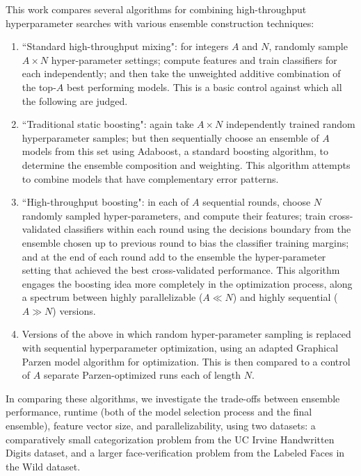 \documentclass[11pt,twocolumn]{article}
\begin{document}
This work compares several algorithms for combining high-throughput hyperparameter searches with various ensemble construction techniques: 
\begin{enumerate}
\item ``Standard high-throughput mixing":  for integers $A$ and $N$, randomly sample $A \times N$ hyper-parameter settings; compute features and train classifiers for each independently; and then take the unweighted additive combination of the top-$A$ best performing models.  This is a basic control against which all the following are judged. 
\item ``Traditional static boosting":  again take $A \times N$ independently trained random hyperparameter samples; but then sequentially choose an ensemble of $A$ models from this set using Adaboost, a standard boosting algorithm, to determine the ensemble composition and weighting.   This algorithm attempts to combine models that have complementary error patterns.  
\item ``High-throughput boosting":  in each of $A$ sequential rounds, choose $N$ randomly sampled hyper-parameters, and compute their features; train cross-validated classifiers within each round using the decisions boundary from the ensemble chosen up to previous round to bias the classifier training margins; and at the end of each round add to the ensemble the hyper-parameter setting that achieved the best cross-validated performance.   This algorithm engages the boosting idea more completely in the optimization process, along a spectrum between highly parallelizable ($A \ll N$) and highly sequential ($A \gg N$) versions.
\item Versions of the above in which random hyper-parameter sampling is replaced with sequential hyperparameter optimization, using an adapted Graphical Parzen model algorithm for optimization.   This is then compared to a control of $A$ separate Parzen-optimized runs each of length $N$.
\end{enumerate}

In comparing these algorithms, we investigate the trade-offs between ensemble performance, runtime (both of the model selection process and the final ensemble), feature vector size, and parallelizability, using two datasets:  a comparatively small categorization problem from the UC Irvine Handwritten Digits dataset, and a larger face-verification problem from the Labeled Faces in the Wild dataset. 


\small


\end{document}
